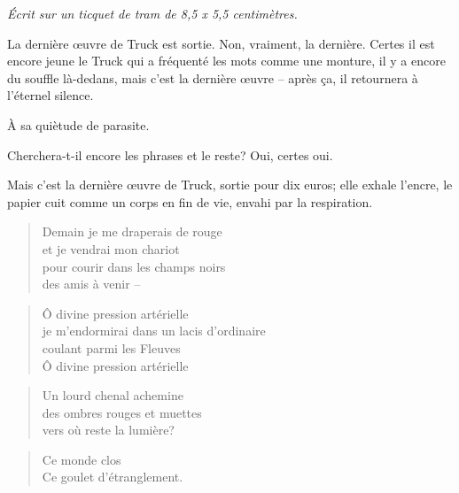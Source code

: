   \begin{center}
    \textit{Écrit sur un ticquet de tram de 8,5 x 5,5 centimètres.}
  \end{center}
  
  La dernière œuvre de Truck est sortie. Non, vraiment, la dernière. Certes
  il est encore jeune le Truck qui a fréquenté les mots comme une monture,
  il y a encore du souffle là-dedans, mais c’est la dernière œuvre -- après
  ça, il retournera à l’éternel silence.

  À sa quiètude de parasite.

  Cherchera-t-il encore les phrases et le reste? Oui, certes oui.

  Mais c’est la dernière œuvre de Truck, sortie pour dix euros; elle exhale
  l’encre, le papier cuit comme un corps en fin de vie, envahi par la
  respiration.

  \begin{verse}
    Demain je me draperais de rouge\\
    et je vendrai mon chariot\\
    pour courir dans les champs noirs\\
    des amis à venir --
  \end{verse}
  \begin{verse}
    Ô divine pression artérielle\\
    je m’endormirai dans un lacis d’ordinaire\\
    coulant parmi les Fleuves\\
    Ô divine pression artérielle
  \end{verse}
  \begin{verse}
    Un lourd chenal achemine\\
    des ombres rouges et muettes\\
    vers où reste la lumière?
  \end{verse}
  \begin{verse}
    Ce monde clos\\
    Ce goulet d’étranglement.
  \end{verse}

